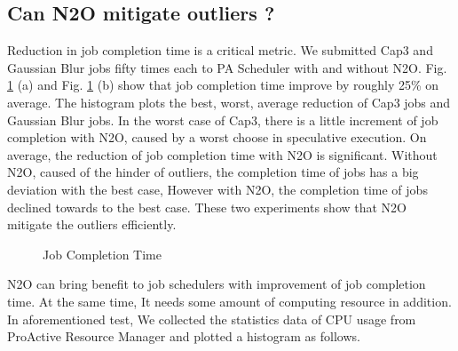 \subsection{Can N2O mitigate outliers ?}

Reduction in job completion time is a critical metric. We submitted Cap3 and Gaussian Blur jobs fifty times each to PA Scheduler with and without N2O. Fig.  \ref{figure:completiontime} (a) and Fig.  \ref{figure:completiontime} (b) show that job completion time improve by roughly 25\% on average. The histogram plots the best, worst, average reduction of Cap3 jobs and Gaussian Blur jobs. In the worst case of Cap3, there is a little increment of job completion with N2O, caused by a worst choose in speculative execution. On average, the reduction of job completion time with N2O is significant. Without N2O, caused of the hinder of outliers, the completion time of jobs has a big deviation with the best case, However with N2O, the completion time of jobs declined towards to the best case. These two experiments show that N2O mitigate the outliers efficiently.

\begin{figure}
\centering
{}
\caption{Job Completion Time}
\label{figure:completiontime}
\end{figure}

N2O can bring benefit to job schedulers with improvement of job completion time. At the same time, It needs some amount of computing resource in addition. In aforementioned test, We collected the statistics data of CPU usage from ProActive Resource Manager and plotted a histogram as follows.

